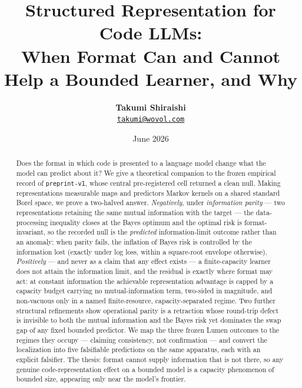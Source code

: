 \documentclass[11pt]{article}
\title{Structured Representation for Code LLMs:\\
       When Format Can and Cannot Help a Bounded Learner, and Why}
\author{%
  \textbf{\large Takumi Shiraishi} \\[2pt]
  \href{mailto:takumi@wovol.com}{\texttt{takumi@wovol.com}}
}
\date{June 2026}
\theoremstyle{plain}
\theoremstyle{definition}
\theoremstyle{remark}
\begin{document}
\maketitle

\begin{abstract}
Does the format in which code is presented to a language model change what the
model can predict about it? We give a theoretical companion to the frozen
empirical record of \texttt{preprint-v1}, whose central pre-registered cell
returned a clean null. Making representations measurable maps and predictors
Markov kernels on a shared standard Borel space, we prove a two-halved answer.
\emph{Negatively}, under \emph{information parity} --- two representations
retaining the same mutual information with the target --- the data-processing
inequality closes at the Bayes optimum and the optimal risk is
format-invariant, so the recorded null is the \emph{predicted} information-limit
outcome rather than an anomaly; when parity fails, the inflation of Bayes risk
is controlled by the information lost (exactly under log loss, within a
square-root envelope otherwise). \emph{Positively} --- and never as a claim that
any effect exists --- a finite-capacity learner does not attain the information
limit, and the residual is exactly where format may act: at constant
information the achievable representation advantage is capped by a capacity
budget carrying no mutual-information term, two-sided in magnitude, and
non-vacuous only in a named finite-resource, capacity-separated regime. Two
further structural refinements show operational parity is a retraction whose
round-trip defect is invisible to both the mutual information and the Bayes
risk yet
dominates the swap gap of any fixed bounded predictor. We map the three frozen
Lumen outcomes to the regimes they occupy --- claiming consistency, not
confirmation --- and convert the localization into five falsifiable predictions
on the same apparatus, each with an explicit falsifier. The thesis: format
cannot supply information that is not there, so any genuine
code-representation effect on a bounded model is a capacity phenomenon of
bounded size, appearing only near the model's frontier.
\end{abstract}

\clearpage
\tableofcontents
\clearpage













\appendix




\end{document}
